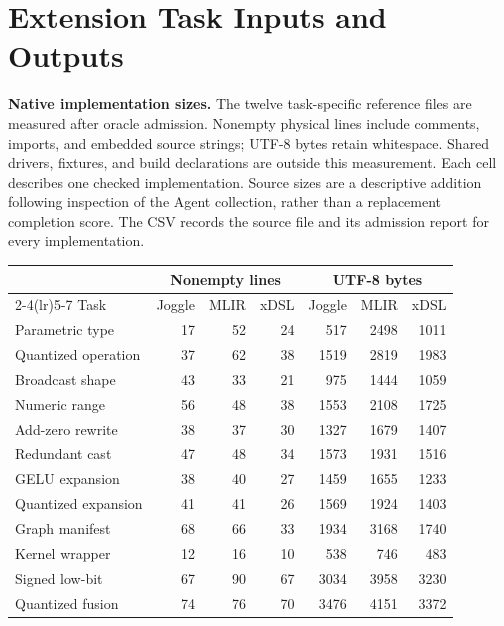 \clearpage
\section{Extension Task Inputs and Outputs}
\label{sec:extension-task-data}

\noindent\textbf{Native implementation sizes.} The twelve task-specific reference files are measured after oracle admission.
Nonempty physical lines include comments, imports, and embedded source strings;
UTF-8 bytes retain whitespace. Shared drivers, fixtures, and build declarations
are outside this measurement. Each cell describes one checked implementation.
Source sizes are a descriptive addition following inspection of the Agent
collection, rather than a replacement completion score. The CSV records the
source file and its admission report for every implementation.

\begin{center}
\small
\setlength{\tabcolsep}{6pt}
\begin{tabular}{@{}lrrrrrr@{}}
\toprule
& \multicolumn{3}{c}{Nonempty lines} & \multicolumn{3}{c}{UTF-8 bytes} \\
\cmidrule(lr){2-4}\cmidrule(lr){5-7}
Task & Joggle & MLIR & xDSL & Joggle & MLIR & xDSL \\
\midrule
Parametric type & 17 & 52 & 24 & 517 & 2498 & 1011 \\
Quantized operation & 37 & 62 & 38 & 1519 & 2819 & 1983 \\
Broadcast shape & 43 & 33 & 21 & 975 & 1444 & 1059 \\
Numeric range & 56 & 48 & 38 & 1553 & 2108 & 1725 \\
Add-zero rewrite & 38 & 37 & 30 & 1327 & 1679 & 1407 \\
Redundant cast & 47 & 48 & 34 & 1573 & 1931 & 1516 \\
GELU expansion & 38 & 40 & 27 & 1459 & 1655 & 1233 \\
Quantized expansion & 41 & 41 & 26 & 1569 & 1924 & 1403 \\
Graph manifest & 68 & 66 & 33 & 1934 & 3168 & 1740 \\
Kernel wrapper & 12 & 16 & 10 & 538 & 746 & 483 \\
Signed low-bit & 67 & 90 & 67 & 3034 & 3958 & 3230 \\
Quantized fusion & 74 & 76 & 70 & 3476 & 4151 & 3372 \\
\bottomrule
\end{tabular}
\end{center}

